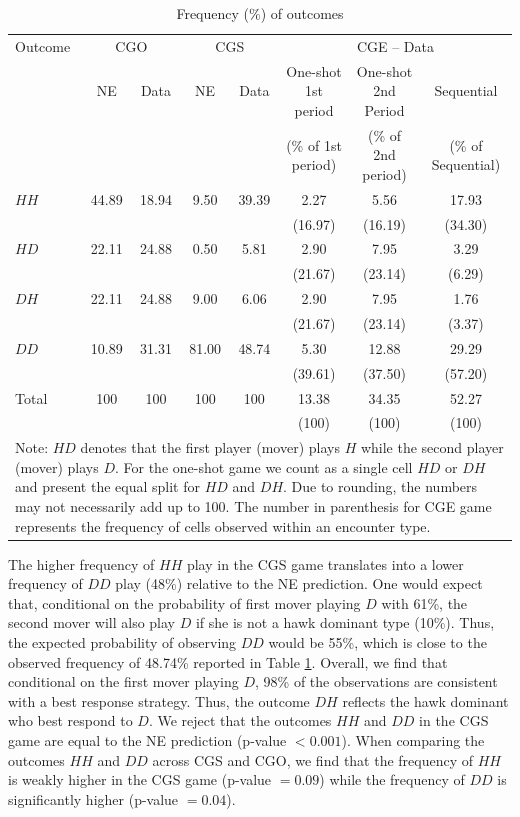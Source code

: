 \documentclass[12pt, letterpaper]{article}
\theoremstyle{plain}
\begin{document}
\begin{table}[ht]
\centering\caption{Frequency (\%) of outcomes}
\footnotesize
\begin{tabular}{lcc|cc|ccc}
\hline
Outcome & \multicolumn{2}{c|}{CGO} & \multicolumn{2}{c|}{CGS} & \multicolumn{3}{c}{CGE -- Data}\\
 & NE & Data & NE & Data & One-shot 1st period & One-shot 2nd Period & Sequential\\
  &  &  &  &  & (\% of 1st period) & (\% of 2nd period) & (\% of Sequential)\\
 \hline
$HH$ & 44.89 & 18.94 & 9.50& 39.39& 2.27  & 5.56& 17.93 \\
 &  &  & & &(16.97) & (16.19) & (34.30) \\
  $HD$ &22.11 & 24.88 & 0.50 & 5.81 & 2.90 & 7.95 & 3.29 \\
  && &  & & (21.67)&  (23.14) &  (6.29)\\
  $DH$ &22.11 & 24.88& 9.00 & 6.06 & 2.90  &7.95 & 1.76 \\
    && & &  &(21.67) & (23.14) &  (3.37)\\
  $DD$ & 10.89 & 31.31& 81.00 &48.74 & 5.30  & 12.88 & 29.29 \\
    &  & &  & & (39.61) &  (37.50)&  (57.20)\\
Total & 100 &100 &100 &100 & 13.38 & 34.35 & 52.27\\
 &  & & & &  (100)&  (100) & (100)\\
\hline   
\multicolumn{8}{p{1\textwidth}}{\scriptsize{Note: $HD$ denotes that the first player (mover) plays $H$ while the second player (mover) plays $D$. For the one-shot game we count as a single cell $HD$ or $DH$ and present the equal split for $HD$ and $DH$. Due to rounding, the numbers may not necessarily add up to 100. The number in parenthesis for CGE game represents the frequency of cells observed within an encounter type.}}\\ 
\end{tabular}
\label{tab(cells)}
\end{table}

The higher frequency of $HH$ play in the CGS game translates into a lower frequency of $DD$ play (48\%) relative to the NE prediction. One would expect that, conditional on the probability of first mover playing $D$ with 61\%, the second mover will also play $D$ if she is not a hawk dominant type (10\%). Thus, the expected probability of observing $DD$ would be 55\%, which is close to the observed frequency of 48.74\% reported in Table \ref{tab(cells)}. Overall, we find that conditional on the first mover playing $D$, 98\% of the observations are consistent with a best response strategy. Thus, the outcome $DH$ reflects the hawk dominant who best respond to $D$. We reject that the outcomes $HH$ and $DD$ in the CGS game are equal to the NE prediction (p-value $<0.001$). When comparing the outcomes $HH$ and $DD$ across CGS and CGO, we find that the frequency of $HH$ is weakly higher in the CGS game (p-value $=0.09$) while the frequency of $DD$ is significantly higher (p-value $=0.04$). 
\end{document}
